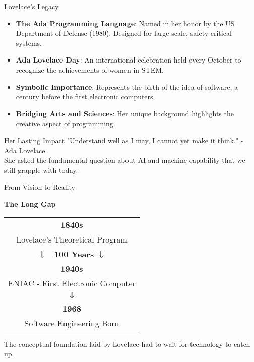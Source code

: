 \documentclass{beamer}
\begin{document}
\begin{frame}{Lovelace's Legacy}
\begin{itemize}
    \item \textbf{The Ada Programming Language}: Named in her honor by the US Department of Defense (1980). Designed for large-scale, safety-critical systems.
    \item \textbf{Ada Lovelace Day}: An international celebration held every October to recognize the achievements of women in STEM.
    \item \textbf{Symbolic Importance}: Represents the birth of the idea of software, a century before the first electronic computers.
    \item \textbf{Bridging Arts and Sciences}: Her unique background highlights the creative aspect of programming.
\end{itemize}

\begin{block}{Her Lasting Impact}
"Understand well as I may, I cannot yet make it think." - Ada Lovelace.\\
She asked the fundamental question about AI and machine capability that we still grapple with today.
\end{block}

\begin{center}
    \quad
\end{center}
\end{frame}

\begin{frame}{From Vision to Reality}
\begin{center}
    \textbf{The Long Gap}\\
    \vspace{0.5cm}
    \begin{tabular}{c}
        \textbf{1840s} \\
        Lovelace's Theoretical Program \\
        $\Downarrow$ \textbf{~100 Years} $\Downarrow$ \\
        \textbf{1940s} \\
        ENIAC - First Electronic Computer \\
        $\Downarrow$ \\
        \textbf{1968} \\
        Software Engineering Born
    \end{tabular}
\end{center}
\begin{block}{}
The conceptual foundation laid by Lovelace had to wait for technology to catch up.
\end{block}
\end{frame}
\end{document}
